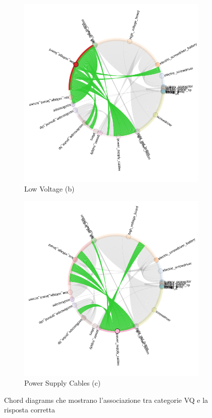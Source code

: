 \begin{figure}[ht]
\begin{subfigure}[b]{0.32\textwidth}
        \includegraphics[width=\linewidth]{Images/enigma_amb_low_voltage.png}
        \caption{Low Voltage (b)}
        \label{fig:low_voltage}
    \end{subfigure}
    \hfill
    \begin{subfigure}[b]{0.32\textwidth}
        \includegraphics[width=\linewidth]{Images/enigma_amb_power_supply.png}
        \caption{Power Supply Cables (c)}
        \label{fig:power_supply}
    \end{subfigure}
    \caption{Chord diagrams che mostrano l'associazione tra categorie VQ e la risposta corretta}
    \label{fig:enigma_chord}
\end{figure}


